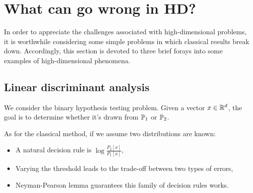\section{What can go wrong in HD?}
In order to appreciate the challenges associated with high-dimensional problems, it is worthwhile considering some simple problems in which classical results break down. Accordingly, this section is devoted to three brief forays into some examples of high-dimensional phenomena.

\subsection{Linear discriminant analysis}
We consider the binary hypothesis testing problem. Given a vector $x\in \mathbb{R}^d$, the goal is to determine whether it's drawn from $\mathbb{P}_1$ or $\mathbb{P}_2$. 

As for the classical method, if we assume two distributions are known: 
\begin{itemize}
    \item A natural decision rule is $ \log \frac{P_2[x]}{P_1[x]} $, 
    \item Varying the threshold leads to the trade-off between two types of errors,
    \item Neyman-Pearson lemma guarantees this family of decision rules works. 
\end{itemize}

